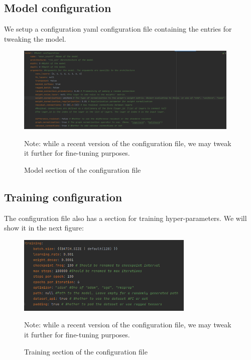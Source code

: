 \subsection{Model configuration}
We setup a configuration \acrshort{yaml} configuration file containing the entries for tweaking the model.
\begin{figure}[ht]
	\centering
	\includegraphics[width=0.95\textwidth]{Figures/ModelConfiguration.png}
	\caption{Model section of the configuration file \label{fig:ModelConfiguration}}
	\small{Note: while a recent version of the configuration file, we may tweak it further for fine-tuning purposes.}
\end{figure}
\FloatBarrier
\subsection{Training configuration}
The configuration file also has a section for training hyper-parameters. We will show it in the next figure:
\begin{figure}[H]
	\centering
	\includegraphics[width=0.75\textwidth]{Figures/TrainingConfiguration.png}
	\caption{Training section of the configuration file\label{fig:TrainingConfiguration}}
	\small{Note: while a recent version of the configuration file, we may tweak it further for fine-tuning purposes.}
\end{figure}